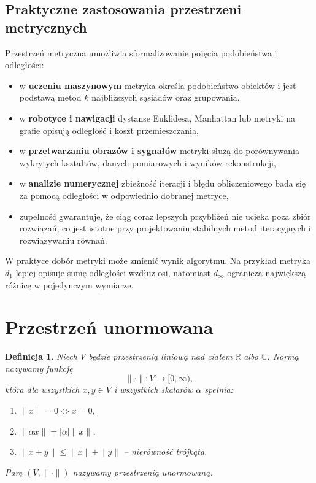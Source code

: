 \documentclass{article}
\newtheorem{definicja}{Definicja}
\begin{document}
\subsection{Praktyczne zastosowania przestrzeni metrycznych}
Przestrzeń metryczna umożliwia sformalizowanie pojęcia podobieństwa i odległości:
\begin{itemize}
    \item w \textbf{uczeniu maszynowym} metryka określa podobieństwo obiektów i jest podstawą metod $k$ najbliższych sąsiadów oraz grupowania,
    \item w \textbf{robotyce i nawigacji} dystanse Euklidesa, Manhattan lub metryki na grafie opisują odległość i koszt przemieszczania,
    \item w \textbf{przetwarzaniu obrazów i sygnałów} metryki służą do porównywania wykrytych kształtów, danych pomiarowych i wyników rekonstrukcji,
    \item w \textbf{analizie numerycznej} zbieżność iteracji i błędu obliczeniowego bada się za pomocą odległości w odpowiednio dobranej metryce,
    \item zupełność gwarantuje, że ciąg coraz lepszych przybliżeń nie ucieka poza zbiór rozwiązań, co jest istotne przy projektowaniu stabilnych metod iteracyjnych i rozwiązywaniu równań.
\end{itemize}
W praktyce dobór metryki może zmienić wynik algorytmu. Na przykład metryka $d_1$ lepiej opisuje sumę odległości wzdłuż osi, natomiast $d_\infty$ ogranicza największą różnicę w pojedynczym wymiarze.

\section{Przestrzeń unormowana}

\begin{definicja}
Niech $V$ będzie przestrzenią liniową nad ciałem $\mathbb R$ albo $\mathbb C$. Normą nazywamy funkcję
\[
\|\cdot\|:V\rightarrow[0,\infty),
\]
która dla wszystkich $x,y\in V$ i wszystkich skalarów $\alpha$ spełnia:
\begin{enumerate}[label=(N\arabic*)]
    \item $\|x\|=0 \iff x=0$,
    \item $\|\alpha x\|=|\alpha|\|x\|$,
    \item $\|x+y\|\leq\|x\|+\|y\|$ -- nierówność trójkąta.
\end{enumerate}
Parę $(V,\|\cdot\|)$ nazywamy przestrzenią unormowaną.
\end{definicja}
\end{document}

